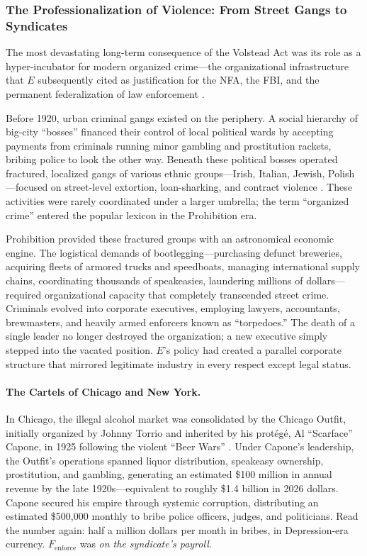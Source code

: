 \subsubsection{The Professionalization of Violence: From Street Gangs to Syndicates}
\label{sec:prohibition_gangs}

The most devastating long-term consequence of the Volstead Act was its role as a hyper-incubator for modern organized crime---the organizational infrastructure that $E$ subsequently cited as justification for the NFA, the FBI, and the permanent federalization of law enforcement \cite{mobmuseum_profits, archives_gangster}.

Before 1920, urban criminal gangs existed on the periphery. A social hierarchy of big-city ``bosses'' financed their control of local political wards by accepting payments from criminals running minor gambling and prostitution rackets, bribing police to look the other way. Beneath these political bosses operated fractured, localized gangs of various ethnic groups---Irish, Italian, Jewish, Polish---focused on street-level extortion, loan-sharking, and contract violence \cite{ebsco_organized, ebsco_gangsters}. These activities were rarely coordinated under a larger umbrella; the term ``organized crime'' entered the popular lexicon in the Prohibition era.

Prohibition provided these fractured groups with an astronomical economic engine. The logistical demands of bootlegging---purchasing defunct breweries, acquiring fleets of armored trucks and speedboats, managing international supply chains, coordinating thousands of speakeasies, laundering millions of dollars---required organizational capacity that completely transcended street crime. Criminals evolved into corporate executives, employing lawyers, accountants, brewmasters, and heavily armed enforcers known as ``torpedoes.'' The death of a single leader no longer destroyed the organization; a new executive simply stepped into the vacated position. $E$'s policy had created a parallel corporate structure that mirrored legitimate industry in every respect except legal status.

\paragraph{The Cartels of Chicago and New York.}
In Chicago, the illegal alcohol market was consolidated by the Chicago Outfit, initially organized by Johnny Torrio and inherited by his prot\'{e}g\'{e}, Al ``Scarface'' Capone, in 1925 following the violent ``Beer Wars'' \cite{mobmuseum_profits}. Under Capone's leadership, the Outfit's operations spanned liquor distribution, speakeasy ownership, prostitution, and gambling, generating an estimated \$100 million in annual revenue by the late 1920s---equivalent to roughly \$1.4 billion in 2026 dollars. Capone secured his empire through systemic corruption, distributing an estimated \$500,000 monthly to bribe police officers, judges, and politicians. Read the number again: half a million dollars per month in bribes, in Depression-era currency. $F_{\text{enforce}}$ was \textit{on the syndicate's payroll}.


